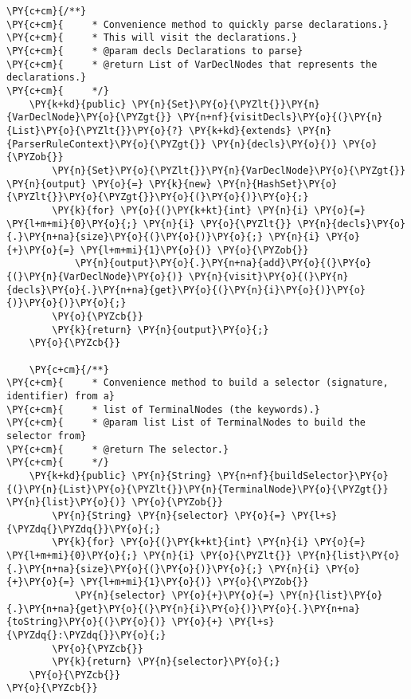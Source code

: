 \begin{Verbatim}[commandchars=\\\{\}]
    \PY{c+cm}{/**}
\PY{c+cm}{     * Convenience method to quickly parse declarations.}
\PY{c+cm}{     * This will visit the declarations.}
\PY{c+cm}{     * @param decls Declarations to parse}
\PY{c+cm}{     * @return List of VarDeclNodes that represents the declarations.}
\PY{c+cm}{     */}
    \PY{k+kd}{public} \PY{n}{Set}\PY{o}{\PYZlt{}}\PY{n}{VarDeclNode}\PY{o}{\PYZgt{}} \PY{n+nf}{visitDecls}\PY{o}{(}\PY{n}{List}\PY{o}{\PYZlt{}}\PY{o}{?} \PY{k+kd}{extends} \PY{n}{ParserRuleContext}\PY{o}{\PYZgt{}} \PY{n}{decls}\PY{o}{)} \PY{o}{\PYZob{}}
        \PY{n}{Set}\PY{o}{\PYZlt{}}\PY{n}{VarDeclNode}\PY{o}{\PYZgt{}} \PY{n}{output} \PY{o}{=} \PY{k}{new} \PY{n}{HashSet}\PY{o}{\PYZlt{}}\PY{o}{\PYZgt{}}\PY{o}{(}\PY{o}{)}\PY{o}{;}
        \PY{k}{for} \PY{o}{(}\PY{k+kt}{int} \PY{n}{i} \PY{o}{=} \PY{l+m+mi}{0}\PY{o}{;} \PY{n}{i} \PY{o}{\PYZlt{}} \PY{n}{decls}\PY{o}{.}\PY{n+na}{size}\PY{o}{(}\PY{o}{)}\PY{o}{;} \PY{n}{i} \PY{o}{+}\PY{o}{=} \PY{l+m+mi}{1}\PY{o}{)} \PY{o}{\PYZob{}}
            \PY{n}{output}\PY{o}{.}\PY{n+na}{add}\PY{o}{(}\PY{o}{(}\PY{n}{VarDeclNode}\PY{o}{)} \PY{n}{visit}\PY{o}{(}\PY{n}{decls}\PY{o}{.}\PY{n+na}{get}\PY{o}{(}\PY{n}{i}\PY{o}{)}\PY{o}{)}\PY{o}{)}\PY{o}{;}
        \PY{o}{\PYZcb{}}
        \PY{k}{return} \PY{n}{output}\PY{o}{;}
    \PY{o}{\PYZcb{}}
    
    \PY{c+cm}{/**}
\PY{c+cm}{     * Convenience method to build a selector (signature, identifier) from a}
\PY{c+cm}{     * list of TerminalNodes (the keywords).}
\PY{c+cm}{     * @param list List of TerminalNodes to build the selector from}
\PY{c+cm}{     * @return The selector.}
\PY{c+cm}{     */}
    \PY{k+kd}{public} \PY{n}{String} \PY{n+nf}{buildSelector}\PY{o}{(}\PY{n}{List}\PY{o}{\PYZlt{}}\PY{n}{TerminalNode}\PY{o}{\PYZgt{}} \PY{n}{list}\PY{o}{)} \PY{o}{\PYZob{}}
        \PY{n}{String} \PY{n}{selector} \PY{o}{=} \PY{l+s}{\PYZdq{}\PYZdq{}}\PY{o}{;}
        \PY{k}{for} \PY{o}{(}\PY{k+kt}{int} \PY{n}{i} \PY{o}{=} \PY{l+m+mi}{0}\PY{o}{;} \PY{n}{i} \PY{o}{\PYZlt{}} \PY{n}{list}\PY{o}{.}\PY{n+na}{size}\PY{o}{(}\PY{o}{)}\PY{o}{;} \PY{n}{i} \PY{o}{+}\PY{o}{=} \PY{l+m+mi}{1}\PY{o}{)} \PY{o}{\PYZob{}}
            \PY{n}{selector} \PY{o}{+}\PY{o}{=} \PY{n}{list}\PY{o}{.}\PY{n+na}{get}\PY{o}{(}\PY{n}{i}\PY{o}{)}\PY{o}{.}\PY{n+na}{toString}\PY{o}{(}\PY{o}{)} \PY{o}{+} \PY{l+s}{\PYZdq{}:\PYZdq{}}\PY{o}{;}
        \PY{o}{\PYZcb{}}
        \PY{k}{return} \PY{n}{selector}\PY{o}{;}
    \PY{o}{\PYZcb{}}
\PY{o}{\PYZcb{}}
\end{Verbatim}
